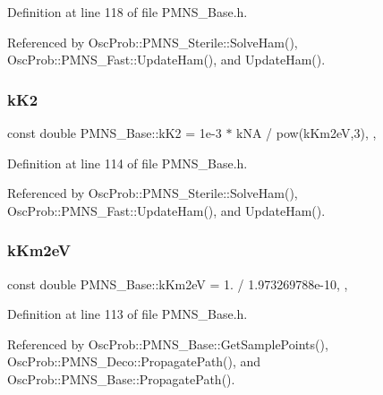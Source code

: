 Definition at line 118 of file P\+M\+N\+S\+\_\+\+Base.\+h.



Referenced by Osc\+Prob\+::\+P\+M\+N\+S\+\_\+\+Sterile\+::\+Solve\+Ham(), Osc\+Prob\+::\+P\+M\+N\+S\+\_\+\+Fast\+::\+Update\+Ham(), and Update\+Ham().

\mbox{\label{classOscProb_1_1PMNS__Base_a326fc5016d7dd7ce05682c06cdcb6d94}} 
\subsubsection{\texorpdfstring{k\+K2}{kK2}}
{\footnotesize\ttfamily const double P\+M\+N\+S\+\_\+\+Base\+::k\+K2 = 1e-\/3 $\ast$ k\+N\+A / pow(k\+Km2e\+V,3)\hspace{0.3cm}{\ttfamily [static]}, {\ttfamily [protected]}, {\ttfamily [inherited]}}



Definition at line 114 of file P\+M\+N\+S\+\_\+\+Base.\+h.



Referenced by Osc\+Prob\+::\+P\+M\+N\+S\+\_\+\+Sterile\+::\+Solve\+Ham(), Osc\+Prob\+::\+P\+M\+N\+S\+\_\+\+Fast\+::\+Update\+Ham(), and Update\+Ham().

\mbox{\label{classOscProb_1_1PMNS__Base_a382ddd7b76ca89b43f22614a2ea7327b}} 
\subsubsection{\texorpdfstring{k\+Km2eV}{kKm2eV}}
{\footnotesize\ttfamily const double P\+M\+N\+S\+\_\+\+Base\+::k\+Km2eV = 1. / 1.\+973269788e-\/10\hspace{0.3cm}{\ttfamily [static]}, {\ttfamily [protected]}, {\ttfamily [inherited]}}



Definition at line 113 of file P\+M\+N\+S\+\_\+\+Base.\+h.



Referenced by Osc\+Prob\+::\+P\+M\+N\+S\+\_\+\+Base\+::\+Get\+Sample\+Points(), Osc\+Prob\+::\+P\+M\+N\+S\+\_\+\+Deco\+::\+Propagate\+Path(), and Osc\+Prob\+::\+P\+M\+N\+S\+\_\+\+Base\+::\+Propagate\+Path().

